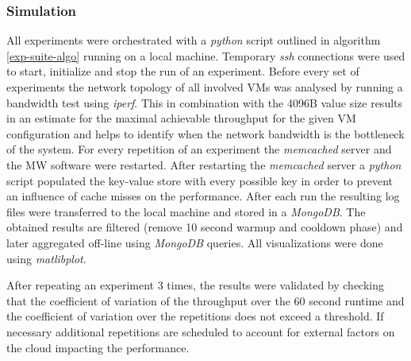 \documentclass[report.tex]{subfiles}
\begin{document}
\subsubsection{Simulation}\label{simulation}

All experiments were orchestrated with a \emph{python} script outlined in algorithm \ref{exp-suite-algo} running on a local machine. Temporary \emph{ssh} connections were used to start, initialize and stop the run of an experiment. 
Before every set of experiments the network topology of all involved VMs was analysed by running a bandwidth test using \emph{iperf}. This in combination with the 4096B value size results in an estimate for the maximal achievable throughput for the given VM configuration and helps to identify when the network bandwidth is the bottleneck of the system.
For every repetition of an experiment the \emph{memcached} server and the MW software were restarted. After restarting the \emph{memcached} server a \emph{python} script populated the key-value store with every possible key in order to prevent an influence of cache misses on the performance. 
After each run  the resulting log files were transferred to the local machine and stored in a \emph{MongoDB}.
The obtained results are filtered (remove 10 second warmup and cooldown phase) and later aggregated off-line using \emph{MongoDB} queries.
All visualizations were done using \emph{matlibplot}.

After repeating an experiment 3 times, the results were validated by checking that the coefficient of variation of the throughput over the 60 second runtime and the coefficient of variation over the repetitions does not exceed a threshold. If necessary additional repetitions are scheduled to account for external factors on the cloud impacting the performance.
\end{document}
